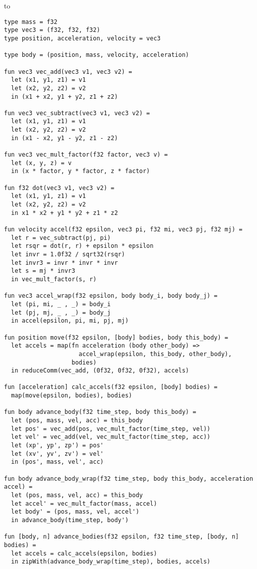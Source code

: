 to

\begin{lstlisting}
type mass = f32
type vec3 = (f32, f32, f32)
type position, acceleration, velocity = vec3

type body = (position, mass, velocity, acceleration)

fun vec3 vec_add(vec3 v1, vec3 v2) =
  let (x1, y1, z1) = v1
  let (x2, y2, z2) = v2
  in (x1 + x2, y1 + y2, z1 + z2)

fun vec3 vec_subtract(vec3 v1, vec3 v2) =
  let (x1, y1, z1) = v1
  let (x2, y2, z2) = v2
  in (x1 - x2, y1 - y2, z1 - z2)

fun vec3 vec_mult_factor(f32 factor, vec3 v) =
  let (x, y, z) = v
  in (x * factor, y * factor, z * factor)

fun f32 dot(vec3 v1, vec3 v2) =
  let (x1, y1, z1) = v1
  let (x2, y2, z2) = v2
  in x1 * x2 + y1 * y2 + z1 * z2

fun velocity accel(f32 epsilon, vec3 pi, f32 mi, vec3 pj, f32 mj) =
  let r = vec_subtract(pj, pi)
  let rsqr = dot(r, r) + epsilon * epsilon
  let invr = 1.0f32 / sqrt32(rsqr)
  let invr3 = invr * invr * invr
  let s = mj * invr3
  in vec_mult_factor(s, r)

fun vec3 accel_wrap(f32 epsilon, body body_i, body body_j) =
  let (pi, mi, _ , _) = body_i
  let (pj, mj, _ , _) = body_j
  in accel(epsilon, pi, mi, pj, mj)

fun position move(f32 epsilon, [body] bodies, body this_body) =
  let accels = map(fn acceleration (body other_body) =>
                     accel_wrap(epsilon, this_body, other_body),
                   bodies)
  in reduceComm(vec_add, (0f32, 0f32, 0f32), accels)

fun [acceleration] calc_accels(f32 epsilon, [body] bodies) =
  map(move(epsilon, bodies), bodies)

fun body advance_body(f32 time_step, body this_body) =
  let (pos, mass, vel, acc) = this_body
  let pos' = vec_add(pos, vec_mult_factor(time_step, vel))
  let vel' = vec_add(vel, vec_mult_factor(time_step, acc))
  let (xp', yp', zp') = pos'
  let (xv', yv', zv') = vel'
  in (pos', mass, vel', acc)

fun body advance_body_wrap(f32 time_step, body this_body, acceleration accel) =
  let (pos, mass, vel, acc) = this_body
  let accel' = vec_mult_factor(mass, accel)
  let body' = (pos, mass, vel, accel')
  in advance_body(time_step, body')

fun [body, n] advance_bodies(f32 epsilon, f32 time_step, [body, n] bodies) =
  let accels = calc_accels(epsilon, bodies)
  in zipWith(advance_body_wrap(time_step), bodies, accels)


\end{lstlisting}
